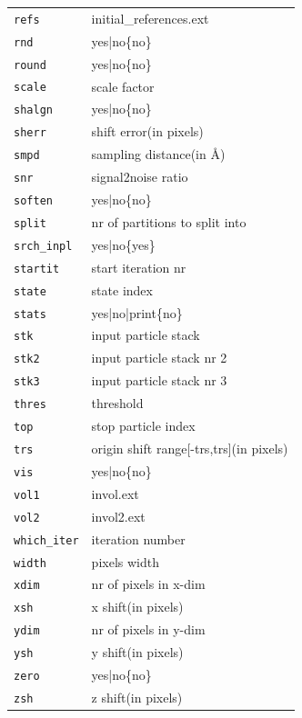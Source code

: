 \documentclass[a4paper,11pt]{article}
\begin{document}
\begin{tabular}{ll}
\texttt{refs}&{initial\_references.ext}\\
\texttt{rnd}&{yes|no\{no\}}\\
\texttt{round}&{yes|no\{no\}}\\
\texttt{scale}&{scale factor}\\
\texttt{shalgn}&{yes|no\{no\}}\\
\texttt{sherr}&{shift error(in pixels)}\\
\texttt{smpd}&{sampling distance(in \AA{})}\\
\texttt{snr}&{signal2noise ratio}\\
\texttt{soften}&{yes|no\{no\}}\\
\texttt{split}&{nr of partitions to split into}\\
\texttt{srch\_inpl}&{yes|no\{yes\}}\\
\texttt{startit}&{start iteration nr}\\
\texttt{state}&{state index}\\
\texttt{stats}&{yes|no|print\{no\}}\\
\texttt{stk}&{input particle stack}\\
\texttt{stk2}&{input particle stack nr 2}\\
\texttt{stk3}&{input particle stack nr 3}\\
\texttt{thres}&{threshold}\\
\texttt{top}&{stop particle index}\\
\texttt{trs}&{origin shift range[-trs,trs](in pixels)}\\
\texttt{vis}&{yes|no\{no\}}\\
\texttt{vol1}&{invol.ext}\\
\texttt{vol2}&{invol2.ext}\\
\texttt{which\_iter}&{iteration number}\\
\texttt{width}&{pixels width}\\
\texttt{xdim}&{nr of pixels in x-dim}\\
\texttt{xsh}&{x shift(in pixels)}\\
\texttt{ydim}&{nr of pixels in y-dim}\\
\texttt{ysh}&{y shift(in pixels)}\\
\texttt{zero}&{yes|no\{no\}}\\
\texttt{zsh}&{z shift(in pixels)}\\
\end{tabular}

\clearpage
\def\bibfont{\footnotesize}


\end{document}

